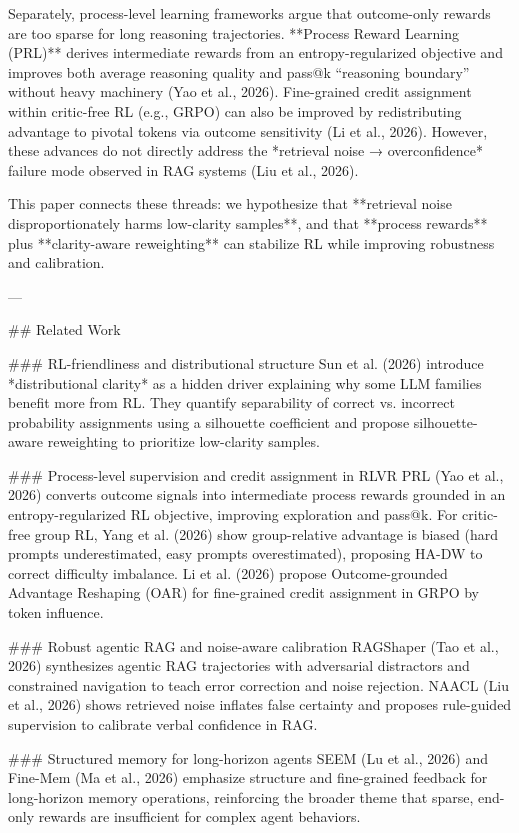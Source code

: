 Separately, process-level learning frameworks argue that outcome-only rewards are too sparse for long reasoning trajectories. **Process Reward Learning (PRL)** derives intermediate rewards from an entropy-regularized objective and improves both average reasoning quality and pass@k “reasoning boundary” without heavy machinery (Yao et al., 2026). Fine-grained credit assignment within critic-free RL (e.g., GRPO) can also be improved by redistributing advantage to pivotal tokens via outcome sensitivity (Li et al., 2026). However, these advances do not directly address the *retrieval noise → overconfidence* failure mode observed in RAG systems (Liu et al., 2026).

This paper connects these threads: we hypothesize that **retrieval noise disproportionately harms low-clarity samples**, and that **process rewards** plus **clarity-aware reweighting** can stabilize RL while improving robustness and calibration.

---

## Related Work  

### RL-friendliness and distributional structure  
Sun et al. (2026) introduce *distributional clarity* as a hidden driver explaining why some LLM families benefit more from RL. They quantify separability of correct vs. incorrect probability assignments using a silhouette coefficient and propose silhouette-aware reweighting to prioritize low-clarity samples.

### Process-level supervision and credit assignment in RLVR  
PRL (Yao et al., 2026) converts outcome signals into intermediate process rewards grounded in an entropy-regularized RL objective, improving exploration and pass@k. For critic-free group RL, Yang et al. (2026) show group-relative advantage is biased (hard prompts underestimated, easy prompts overestimated), proposing HA-DW to correct difficulty imbalance. Li et al. (2026) propose Outcome-grounded Advantage Reshaping (OAR) for fine-grained credit assignment in GRPO by token influence.

### Robust agentic RAG and noise-aware calibration  
RAGShaper (Tao et al., 2026) synthesizes agentic RAG trajectories with adversarial distractors and constrained navigation to teach error correction and noise rejection. NAACL (Liu et al., 2026) shows retrieved noise inflates false certainty and proposes rule-guided supervision to calibrate verbal confidence in RAG.

### Structured memory for long-horizon agents  
SEEM (Lu et al., 2026) and Fine-Mem (Ma et al., 2026) emphasize structure and fine-grained feedback for long-horizon memory operations, reinforcing the broader theme that sparse, end-only rewards are insufficient for complex agent behaviors.

